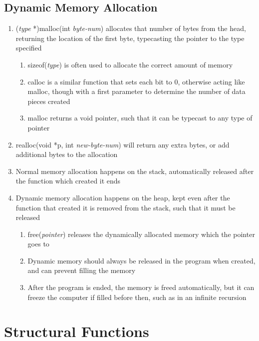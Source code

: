 \documentclass[11 pt, twoside]{article}
\begin{document}
\subsection{Dynamic Memory Allocation}
\begin{enumerate}
\item (\textit{type} *)malloc(int \textit{byte-num}) allocates that number of bytes from the head, returning the location of the first byte, typecasting the pointer to the type specified
\begin{enumerate}
\item sizeof(\textit{type}) is often used to allocate the correct amount of memory
\item calloc is a similar function that sets each bit to 0, otherwise acting like malloc, though with a first parameter to determine the number of data pieces created
\item malloc returns a void pointer, such that it can be typecast to any type of pointer
\end{enumerate}
\item realloc(void *p, int \textit{new-byte-num}) will return any extra bytes, or add additional bytes to the allocation
\item Normal memory allocation happens on the stack, automatically released after the function which created it ends
\item Dynamic memory allocation happens on the heap, kept even after the function that created it is removed from the stack, such that it must be released
\begin{enumerate}
\item free(\textit{pointer}) releases the dynamically allocated memory which the pointer goes to
\item Dynamic memory should always be released in the program when created, and can prevent filling the memory
\item After the program is ended, the memory is freed automatically, but it can freeze the computer if filled before then, such as in an infinite recursion
\end{enumerate}
\end{enumerate}

\section{Structural Functions}
\end{document}
